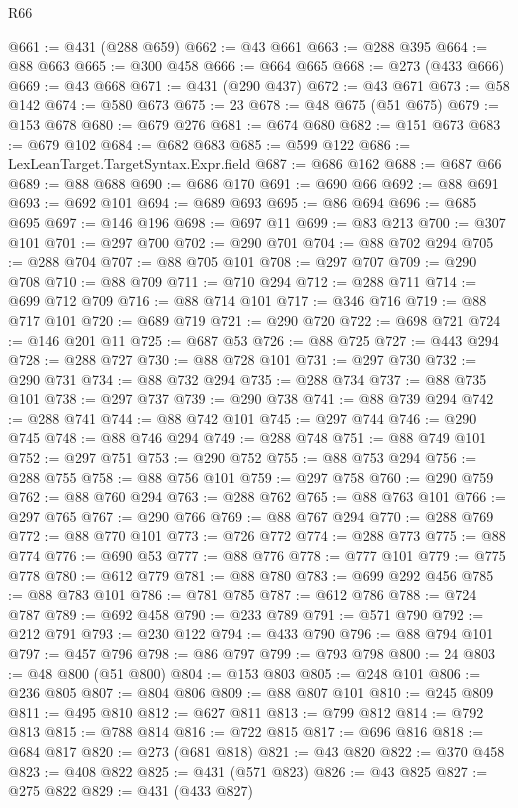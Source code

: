 \begin{lexlean}{R66}
\begin{coremodule}
@661 := @431 (@288 @659)
@662 := @43 @661
@663 := @288 @395
@664 := @88 @663
@665 := @300 @458
@666 := @664 @665
@668 := @273 (@433 @666)
@669 := @43 @668
@671 := @431 (@290 @437)
@672 := @43 @671
@673 := @58 @142
@674 := @580 @673
@675 := 23
@678 := @48 @675 (@51 @675)
@679 := @153 @678
@680 := @679 @276
@681 := @674 @680
@682 := @151 @673
@683 := @679 @102
@684 := @682 @683
@685 := @599 @122
@686 := LexLeanTarget.TargetSyntax.Expr.field
@687 := @686 @162
@688 := @687 @66
@689 := @88 @688
@690 := @686 @170
@691 := @690 @66
@692 := @88 @691
@693 := @692 @101
@694 := @689 @693
@695 := @86 @694
@696 := @685 @695
@697 := @146 @196
@698 := @697 @11
@699 := @83 @213
@700 := @307 @101
@701 := @297 @700
@702 := @290 @701
@704 := @88 @702 @294
@705 := @288 @704
@707 := @88 @705 @101
@708 := @297 @707
@709 := @290 @708
@710 := @88 @709
@711 := @710 @294
@712 := @288 @711
@714 := @699 @712 @709
@716 := @88 @714 @101
@717 := @346 @716
@719 := @88 @717 @101
@720 := @689 @719
@721 := @290 @720
@722 := @698 @721
@724 := @146 @201 @11
@725 := @687 @53
@726 := @88 @725
@727 := @443 @294
@728 := @288 @727
@730 := @88 @728 @101
@731 := @297 @730
@732 := @290 @731
@734 := @88 @732 @294
@735 := @288 @734
@737 := @88 @735 @101
@738 := @297 @737
@739 := @290 @738
@741 := @88 @739 @294
@742 := @288 @741
@744 := @88 @742 @101
@745 := @297 @744
@746 := @290 @745
@748 := @88 @746 @294
@749 := @288 @748
@751 := @88 @749 @101
@752 := @297 @751
@753 := @290 @752
@755 := @88 @753 @294
@756 := @288 @755
@758 := @88 @756 @101
@759 := @297 @758
@760 := @290 @759
@762 := @88 @760 @294
@763 := @288 @762
@765 := @88 @763 @101
@766 := @297 @765
@767 := @290 @766
@769 := @88 @767 @294
@770 := @288 @769
@772 := @88 @770 @101
@773 := @726 @772
@774 := @288 @773
@775 := @88 @774
@776 := @690 @53
@777 := @88 @776
@778 := @777 @101
@779 := @775 @778
@780 := @612 @779
@781 := @88 @780
@783 := @699 @292 @456
@785 := @88 @783 @101
@786 := @781 @785
@787 := @612 @786
@788 := @724 @787
@789 := @692 @458
@790 := @233 @789
@791 := @571 @790
@792 := @212 @791
@793 := @230 @122
@794 := @433 @790
@796 := @88 @794 @101
@797 := @457 @796
@798 := @86 @797
@799 := @793 @798
@800 := 24
@803 := @48 @800 (@51 @800)
@804 := @153 @803
@805 := @248 @101
@806 := @236 @805
@807 := @804 @806
@809 := @88 @807 @101
@810 := @245 @809
@811 := @495 @810
@812 := @627 @811
@813 := @799 @812
@814 := @792 @813
@815 := @788 @814
@816 := @722 @815
@817 := @696 @816
@818 := @684 @817
@820 := @273 (@681 @818)
@821 := @43 @820
@822 := @370 @458
@823 := @408 @822
@825 := @431 (@571 @823)
@826 := @43 @825
@827 := @275 @822
@829 := @431 (@433 @827)

\end{coremodule}
\end{lexlean}
